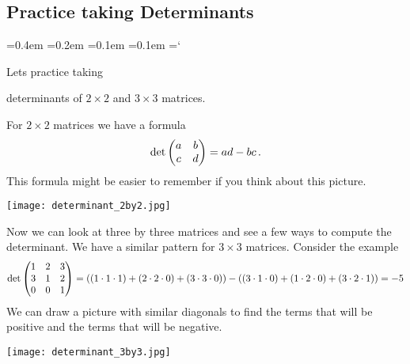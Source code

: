 
\subsection*{Practice taking Determinants}

{\ttfamily
{}\font=0.4em
\font=0.2em
\font=0.1em
\font=0.1em
\hyphenchar\font=`\-





\hypertarget{video_properties_of_determinant_practice}{Lets practice taking} determinants of $2 \times 2$ and $3\times 3$ matrices. 

For $2 \times 2$ matrices we have a formula
\[
{\rm det}
\begin{pmatrix}
a & b \\
c & d \\
\end{pmatrix}
= ad - bc\, .
\]
This formula might be easier to remember if you think about this picture.
\begin{center}
\texttt{[image: determinant\_2by2.jpg]}
\end{center}

Now we can look at three by three matrices and see a few ways to compute the determinant. We have a similar pattern for $3\times 3$ matrices. 
Consider the example 
\[
{\rm det}
\begin{pmatrix}
1 & 2 & 3 \\
3 & 1 & 2 \\
0 & 0 & 1 \\
\end{pmatrix}
= ( (1\cdot 1\cdot 1)+ (2\cdot 2\cdot 0) + (3\cdot 3\cdot 0)) - ((3\cdot 1\cdot 0)+ (1\cdot 2\cdot 0) + (3\cdot 2\cdot 1)) = -5
\]
We can draw a picture with similar diagonals to find the terms that will be positive and the terms that will be negative.

\begin{center}
\texttt{[image: determinant\_3by3.jpg]}
\end{center}


}
